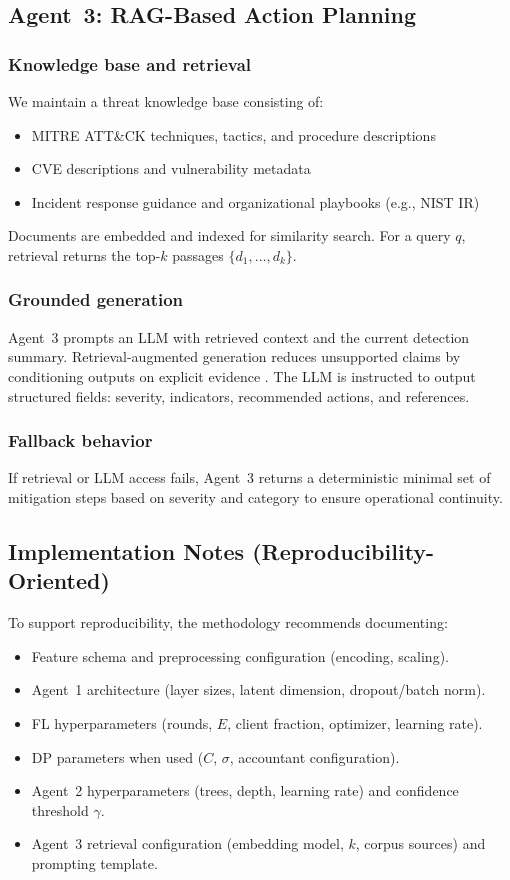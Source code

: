 \documentclass[conference]{IEEEtran}
\begin{document}
\subsection{Agent~3: RAG-Based Action Planning}
\subsubsection{Knowledge base and retrieval}
We maintain a threat knowledge base consisting of:
\begin{itemize}
  \item MITRE ATT\&CK techniques, tactics, and procedure descriptions \cite{attck}
  \item CVE descriptions and vulnerability metadata \cite{cve}
  \item Incident response guidance and organizational playbooks (e.g., NIST IR) \cite{nist80061}
\end{itemize}
Documents are embedded and indexed for similarity search. For a query $q$, retrieval returns the top-$k$ passages $\{d_1,\dots,d_k\}$.

\subsubsection{Grounded generation}
Agent~3 prompts an LLM with retrieved context and the current detection summary. Retrieval-augmented generation reduces unsupported claims by conditioning outputs on explicit evidence \cite{lewis2020rag}. The LLM is instructed to output structured fields: severity, indicators, recommended actions, and references.

\subsubsection{Fallback behavior}
If retrieval or LLM access fails, Agent~3 returns a deterministic minimal set of mitigation steps based on severity and category to ensure operational continuity.

\subsection{Implementation Notes (Reproducibility-Oriented)}
To support reproducibility, the methodology recommends documenting:
\begin{itemize}
  \item Feature schema and preprocessing configuration (encoding, scaling).
  \item Agent~1 architecture (layer sizes, latent dimension, dropout/batch norm).
  \item FL hyperparameters (rounds, $E$, client fraction, optimizer, learning rate).
  \item DP parameters when used ($C$, $\sigma$, accountant configuration).
  \item Agent~2 hyperparameters (trees, depth, learning rate) and confidence threshold $\gamma$.
  \item Agent~3 retrieval configuration (embedding model, $k$, corpus sources) and prompting template.
\end{itemize}
\end{document}
